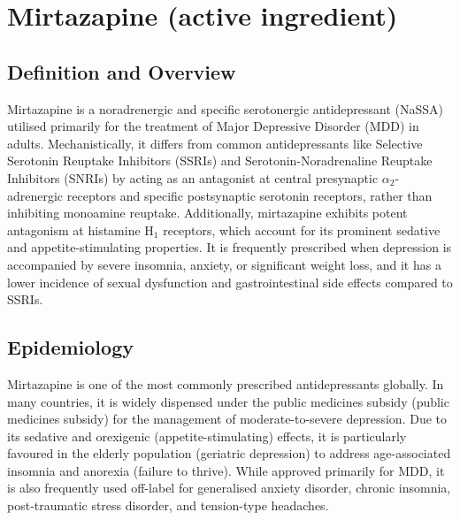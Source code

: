 \chapter{Mirtazapine (active ingredient)}

\section*{Definition and Overview}
Mirtazapine is a noradrenergic and specific serotonergic antidepressant (NaSSA) utilised primarily for the treatment of Major Depressive Disorder (MDD) in adults. Mechanistically, it differs from common antidepressants like Selective Serotonin Reuptake Inhibitors (SSRIs) and Serotonin-Noradrenaline Reuptake Inhibitors (SNRIs) by acting as an antagonist at central presynaptic $\alpha_2$-adrenergic receptors and specific postsynaptic serotonin receptors, rather than inhibiting monoamine reuptake. Additionally, mirtazapine exhibits potent antagonism at histamine H$_1$ receptors, which account for its prominent sedative and appetite-stimulating properties. It is frequently prescribed when depression is accompanied by severe insomnia, anxiety, or significant weight loss, and it has a lower incidence of sexual dysfunction and gastrointestinal side effects compared to SSRIs.

\section*{Epidemiology}
Mirtazapine is one of the most commonly prescribed antidepressants globally. In many countries, it is widely dispensed under the public medicines subsidy (public medicines subsidy) for the management of moderate-to-severe depression. Due to its sedative and orexigenic (appetite-stimulating) effects, it is particularly favoured in the elderly population (geriatric depression) to address age-associated insomnia and anorexia (failure to thrive). While approved primarily for MDD, it is also frequently used off-label for generalised anxiety disorder, chronic insomnia, post-traumatic stress disorder, and tension-type headaches.

